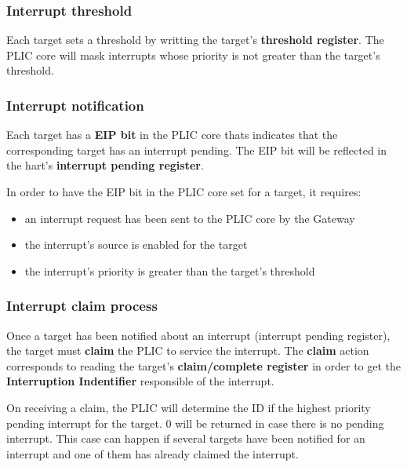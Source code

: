 \documentclass[10pt, a4paper]{article}
\begin{document}
\noindent {}


\subsubsection{Interrupt threshold}

Each target sets a threshold by writting the target's \textbf{threshold register}.
The PLIC core will mask interrupts whose priority is not greater than the target's threshold.\\

\noindent {}


\subsubsection{Interrupt notification}

Each target has a \textbf{EIP bit} in the PLIC core thats indicates that the corresponding target has an interrupt pending. The EIP bit will be reflected in the hart's \textbf{interrupt pending register}.

In order to have the EIP bit in the PLIC core set for a target, it requires:

\begin{itemize}
	\item  an interrupt request has been sent to the PLIC core by the Gateway
	\item the interrupt's source is enabled for the target
	\item the interrupt's priority is greater than the target's threshold
\end{itemize}

\subsubsection{Interrupt claim process}

Once a target has been notified about an interrupt (interrupt pending register), the target must \textbf{claim} the PLIC to service the interrupt. The \textbf{claim} action corresponds to reading the target's \textbf{claim/complete register} in order to get the \textbf{Interruption Indentifier} responsible of the interrupt.

On receiving a claim, the PLIC will determine the ID if the highest priority pending interrupt for the target. 0 will be returned in case there is no pending interrupt. This case can happen if several targets have been notified for an interrupt and one of them has already claimed the interrupt.
\end{document}
